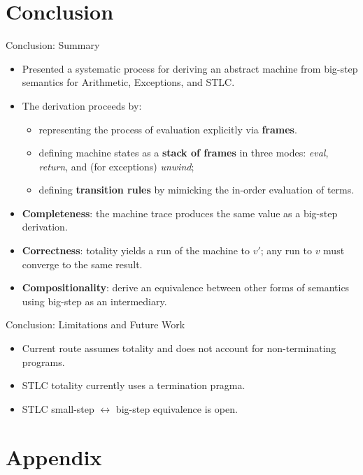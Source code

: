 \documentclass[10pt,compress,aspectratio=169]{beamer}
\begin{document}
\section{Conclusion}
\begin{frame}{Conclusion: Summary}
\begin{itemize}
    \item Presented a systematic process for deriving an abstract machine from big-step semantics for Arithmetic, Exceptions, and STLC.
    \item The derivation proceeds by:
    \begin{itemize}
        \item representing the process of evaluation explicitly via \textbf{frames}.
        \item defining machine states as a \textbf{stack of frames} in three modes: \emph{eval}, \emph{return}, and (for exceptions) \emph{unwind};
        \item defining \textbf{transition rules} by mimicking the in-order evaluation of terms.
    \end{itemize}
    \item \textbf{Completeness}: the machine trace produces the same value as a big-step derivation.
    \item \textbf{Correctness}: totality yields a run of the machine to $v'$; any run to $v$ must converge to the same result.
    \item \textbf{Compositionality}: derive an equivalence between other forms of semantics using big-step as an intermediary.
\end{itemize}
\end{frame}

\begin{frame}{Conclusion: Limitations and Future Work}
\begin{itemize}
    \item Current route assumes totality and does not account for non-terminating programs.
    \item STLC totality currently uses a termination pragma.
    \item STLC small-step $\leftrightarrow$ big-step equivalence is open.
\end{itemize}
\end{frame}

\appendix

\section*{Appendix}
\end{document}
